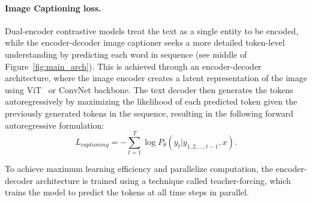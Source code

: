 \documentclass[10pt]{article} \usepackage[accepted]{tmlr}
\begin{document}
\paragraph{Image Captioning loss.}\quad Dual-encoder contrastive models treat the text as a single entity to be encoded, while the encoder-decoder image captioner seeks a more detailed token-level understanding by predicting each word in sequence (see middle of Figure~\ref{fig:main_arch}). This is achieved through an encoder-decoder architecture, where the image encoder creates a latent representation of the image using ViT~\citep{dosovitskiy2020image} or ConvNet backbone. The text decoder then generates the tokens autoregressively by maximizing the likelihood of each predicted token given the previously generated tokens in the sequence, resulting in the following forward autoregressive formulation:
\begin{equation}\label{eqn:gen}
    L_{captioning}=-\sum_{t=1}^{T}\log P_{\theta}(y_t|y_{1, 2, ..., t-1}, x).
\end{equation}

To achieve maximum learning efficiency and parallelize computation, the encoder-decoder architecture is trained using a technique called teacher-forcing, which trains the model to predict the tokens at all time steps in parallel.
\end{document}
